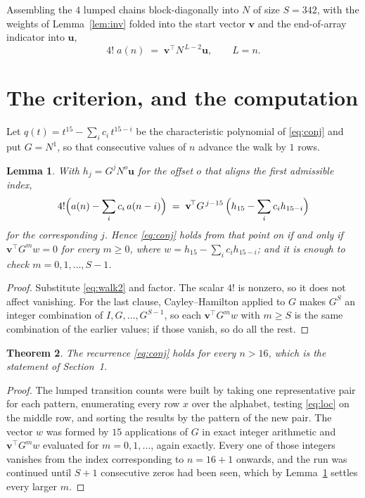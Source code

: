 \documentclass[11pt,a4paper]{article}
\theoremstyle{plain}
\newtheorem{theorem}{Theorem}
\newtheorem{lemma}[theorem]{Lemma}
\theoremstyle{definition}
\begin{document}
Assembling the $4$ lumped chains block-diagonally into $N$ of size $S=342$, with the
weights of Lemma~\ref{lem:inv} folded into the start vector $\mathbf{v}$ and the
end-of-array indicator into $\mathbf{u}$,
\begin{equation}\label{eq:walk2}
4!\;a(n)\;=\;\mathbf{v}^{\!\top}N^{\,L-2}\mathbf{u},\qquad L=n .
\end{equation}

\section{The criterion, and the computation}

Let $q(t)=t^{15}-\sum_i c_i\,t^{15-i}$ be the characteristic polynomial of
\eqref{eq:conj} and put $G=N^{1}$, so that consecutive values of $n$ advance the
walk by $1$ rows.

\begin{lemma}\label{lem:crit}
With $h_j=G^{j}N^{o}\mathbf{u}$ for the offset $o$ that aligns the first admissible
index,
\[
4!\Bigl(a(n)-\sum_i c_i\,a(n-i)\Bigr)\;=\;\mathbf{v}^{\!\top}G^{\,j-15}\,
\Bigl(h_{15}-\sum_i c_i h_{15-i}\Bigr)
\]
for the corresponding $j$. Hence \eqref{eq:conj} holds from that point on if and only if
$\mathbf{v}^{\!\top}G^{m}w=0$ for every $m\ge0$, where
$w=h_{15}-\sum_i c_ih_{15-i}$; and it is enough to check $m=0,1,\dots,S-1$.
\end{lemma}

\begin{proof}
Substitute \eqref{eq:walk2} and factor. The scalar $4!$ is nonzero, so it does not
affect vanishing. For the last clause, Cayley--Hamilton applied to $G$ makes $G^{S}$ an
integer combination of $I,G,\dots,G^{S-1}$, so each $\mathbf{v}^{\!\top}G^{m}w$ with
$m\ge S$ is the same combination of the earlier values; if those vanish, so do all the rest.
\end{proof}

\begin{theorem}
The recurrence \eqref{eq:conj} holds for every $n>16$, which is the statement of
Section~1.
\end{theorem}

\begin{proof}
The lumped transition counts were built by taking one representative pair for each pattern,
enumerating every row $x$ over the alphabet, testing \eqref{eq:loc} on the middle
row, and sorting the results by the pattern of the new pair. The vector $w$ was formed by
$15$ applications of $G$ in exact integer arithmetic and $\mathbf{v}^{\!\top}G^{m}w$
evaluated for $m=0,1,\dots$, again exactly. Every one of those integers vanishes from the
index corresponding to $n=16+1$ onwards, and the run was continued until $S+1$
consecutive zeros had been seen, which by Lemma~\ref{lem:crit} settles every larger $m$.
\end{proof}
\end{document}
